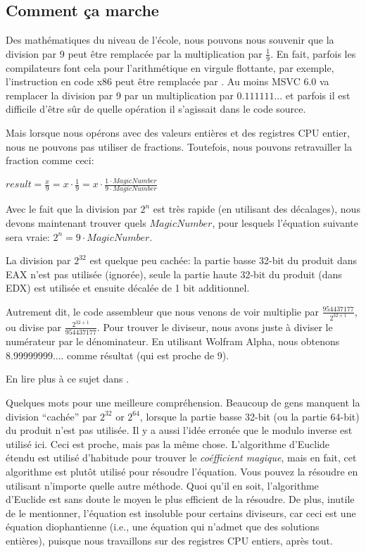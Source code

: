 ﻿\subsection{Comment ça marche}

Des mathématiques du niveau de l'école, nous pouvons nous souvenir que la division
par 9 peut être remplacée par la multiplication par $\frac{1}{9}$.
En fait, parfois les compilateurs font cela pour l'arithmétique en virgule flottante,
par exemple, l'instruction  en code x86 peut être remplacée par .
Au moins MSVC 6.0 va remplacer la division par 9 par un multiplication par $0.111111...$
et parfois il est difficile d'être sûr de quelle opération il s'agissait dans le
code source.

Mais lorsque nous opérons avec des valeurs entières et des registres CPU entier,
nous ne pouvons pas utiliser de fractions.
Toutefois, nous pouvons retravailler la fraction comme ceci:

\begin{center}
$result = \frac{x}{9} = x \cdot \frac{1}{9} = x \cdot \frac{1 \cdot MagicNumber}{9 \cdot MagicNumber}$
\end{center}

Avec le fait que la division par $2^n$ est très rapide (en utilisant des décalages),
nous devons maintenant trouver quels $MagicNumber$, pour lesquels l'équation suivante
sera vraie: $2^n = 9 \cdot MagicNumber$.

La division par $2^{32}$ est quelque peu cachée: la partie basse 32-bit du produit
dans EAX n'est pas utilisée (ignorée), seule la partie haute 32-bit du produit
(dans EDX) est utilisée et ensuite décalée de 1 bit additionnel.

Autrement dit, le code assembleur que nous venons de voir multiplie par {\Large $\frac{954437177}{2^{32+1}}$},
ou divise par {\Large $\frac{2^{32+1}}{954437177}$}.
Pour trouver le diviseur, nous avons juste à diviser le numérateur par le dénominateur.
En utilisant Wolfram Alpha, nous obtenons 8.99999999.... comme résultat (qui est
proche de 9).


En lire plus à ce sujet dans .

Quelques mots pour une meilleure compréhension.
Beaucoup de gens manquent la division ``cachée'' par $2^{32}$ or $2^{64}$, lorsque
la partie basse 32-bit (ou la partie 64-bit) du produit n'est pas utilisée.
Il y a aussi l'idée erronée que le modulo inverse est utilisé ici. Ceci est proche,
mais pas la même chose.
L'algorithme d'Euclide étendu est utilisé d'habitude pour trouver le \textit{ coéfficient magique},
mais en fait, cet algorithme est plutôt utilisé pour résoudre l'équation. Vous pouvez la résoudre
en utilisant n'importe quelle autre méthode.
Quoi qu'il en soit, l'algorithme d'Euclide est sans doute le moyen le plus efficient
de la résoudre.
De plus, inutile de le mentionner, l'équation est insoluble pour certains diviseurs,
car ceci est une équation diophantienne (i.e., une équation qui n'admet que des solutions
entières), puisque nous travaillons sur des registres CPU entiers, après tout.
